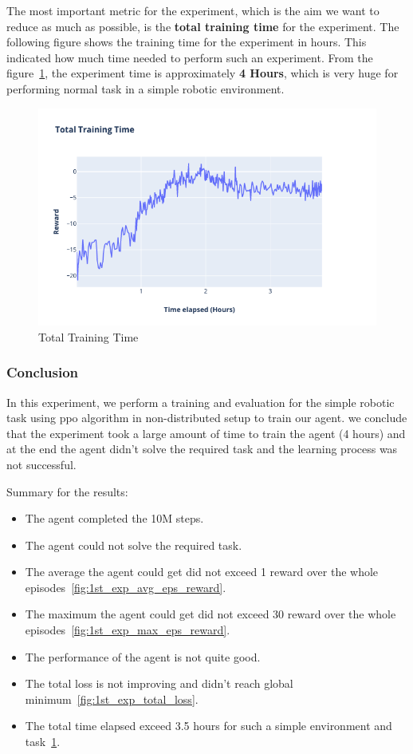 The most important metric for the experiment, which is the aim we want to reduce as much as possible, is the \textbf{total training time} for the experiment. The following figure shows the training time for the experiment in hours. This indicated how much time needed to perform such an experiment. From the figure~\ref{fig:1st_exp_total_training_time}, the experiment time is approximately \textbf{4 Hours}, which is very huge for performing normal task in a simple robotic environment.
\begin{figure}[H]
	\centering
	\includegraphics[width=\linewidth]{figures/exps/1st_exp/total_time}
	\caption{Total Training Time}
	\label{fig:1st_exp_total_training_time}
\end{figure}

\subsubsection{Conclusion}

In this experiment, we perform a training and evaluation for the simple robotic task using ppo algorithm in non-distributed setup to train our agent. we conclude that the experiment took a large amount of time to train the agent (4 hours) and at the end the agent didn't solve the required task and the learning process was not successful. 

Summary for the results:
\begin{itemize}
	\item The agent completed the 10M steps.
	\item The agent could not solve the required task.
	\item The average the agent could get did not exceed 1 reward over the whole episodes~\ref{fig:1st_exp_avg_eps_reward}.
	\item The maximum the agent could get did not exceed 30 reward over the whole episodes~\ref{fig:1st_exp_max_eps_reward}.
	\item The performance of the agent is not quite good.
	\item The total loss is not improving and didn't reach global minimum~\ref{fig:1st_exp_total_loss}.
	\item The total time elapsed exceed 3.5 hours for such a simple environment and task~\ref{fig:1st_exp_total_training_time}.
\end{itemize}